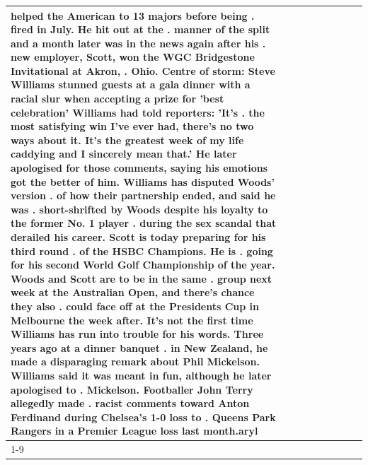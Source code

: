 \begin{table}[H]
\begin{tabular}{lllrlllll}
helped the American to 13 majors before being . fired in July. He hit out at the . manner of the split and a month later was in the news again after his . new employer, Scott, won the WGC Bridgestone Invitational at Akron, . Ohio. Centre of storm: Steve Williams stunned guests at a gala dinner with a racial slur when accepting a prize for 'best celebration' Williams had told reporters: 'It's . the most satisfying win I've ever had, there's no two ways about it. It's the greatest week of my life caddying and I sincerely mean that.' He later apologised for those comments, saying his emotions got the better of him. Williams has disputed Woods' version . of how their partnership ended, and said he was . short-shrifted by Woods despite his loyalty to the former No. 1 player . during the sex scandal that derailed his career. Scott is today preparing for his third round . of the HSBC Champions. He is . going for his second World Golf Championship of the year. Woods and Scott are to be in the same . group next week at the Australian Open, and there's chance they also . could face off at the Presidents Cup in Melbourne the week after. It's not the first time Williams has run into trouble for his words. Three years ago at a dinner banquet . in New Zealand, he made a disparaging remark about Phil Mickelson. Williams said it was meant in fun, although he later apologised to . Mickelson. Footballer John Terry allegedly made . racist comments toward Anton Ferdinand during Chelsea's 1-0 loss to . Queens Park Rangers in a Premier League loss last month.aryl \\
\cline{1-9}

\end{tabular}
\end{table}
